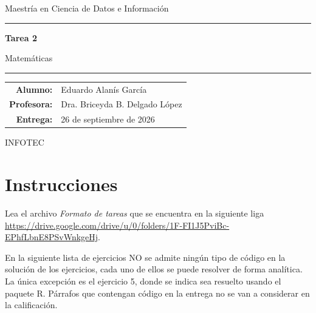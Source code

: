 \documentclass[11pt,letterpaper]{article}
\newcommand{\asignaturaNombre}{Matemáticas}
\newcommand{\tareaNombre}{Tarea 2}
\newcommand{\autorNombre}{Eduardo Alanís García}
\newcommand{\profesorNombre}{Dra. Briceyda B. Delgado López}
\newcommand{\fechaEntrega}{26 de septiembre de 2026}
\theoremstyle{coloredplain}
\theoremstyle{coloreddef}
\begin{document}

\begin{titlepage}
  \thispagestyle{plain}
  \centering
  \vspace*{2.5cm}

  {\sffamily\color{secondary}\large Maestría en Ciencia de Datos e Información \par}
  \vspace{0.3cm}
  {\color{primary}\rule{0.5\textwidth}{0.8pt}\par}
  \vspace{2.2cm}

  {\sffamily\bfseries\color{primary}\Huge \tareaNombre \par}
  \vspace{0.6cm}
  {\sffamily\Large \asignaturaNombre \par}

  \vspace{3.5cm}
  {\color{primary!60}\rule{0.6\textwidth}{0.4pt}\par}
  \vspace{1cm}

  \begin{tabular}{rl}
    \textbf{Alumno:}   & \autorNombre \\[2pt]
    \textbf{Profesora:} & \profesorNombre \\[2pt]
    \textbf{Entrega:}    & \fechaEntrega \\
  \end{tabular}

  \vfill
  {\small\color{secondary} INFOTEC \par}
\end{titlepage}



\section*{Instrucciones}
Lea el archivo \emph{Formato de tareas} que se encuentra en la siguiente liga
\url{https://drive.google.com/drive/u/0/folders/1F-FI1J5PviBc-EPhfLbnE8PSvWnkgeHj}.

En la siguiente lista de ejercicios NO se admite ningún tipo de código en la
solución de los ejercicios, cada uno de ellos se puede resolver de forma
analítica. La única excepción es el ejercicio 5, donde se indica sea resuelto
usando el paquete R. Párrafos que contengan código en la entrega no se van a
considerar en la calificación.
\end{document}
